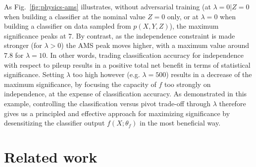 \documentclass[twocolumn,superscriptaddress,aps]{revtex4-1}
\theoremstyle{plain}
\begin{document}
As  Fig.~\ref{fig:physics-ams} illustrates, without adversarial training (at
$\lambda=0|Z=0$ when building a classifier at the nominal value $Z=0$ only, or
at $\lambda=0$ when building a classifier on data sampled from $p(X,Y,Z)$), the
maximum significance peaks at $7$. By contrast, as the independence constraint
is made stronger (for $\lambda > 0$) the AMS peak moves higher, with a maximum
value around  $7.8$ for $\lambda=10$. In other words, trading classification
accuracy for independence with respect to pileup results in a positive total net
benefit in terms of statistical significance. Setting $\lambda$ too high however
(e.g. $\lambda=500$) results in a decrease of the maximum significance, by
focusing the capacity of $f$ too strongly on independence, at the expense of
classification accuracy. As demonstrated in this example, controlling the
classification versus pivot trade-off through $\lambda$ therefore gives us a
principled and effective approach for maximizing significance by desensitizing
the classifier output $f(X;\theta_f)$ in the most beneficial way.



\section{Related work}
\label{sec:related}
\end{document}
